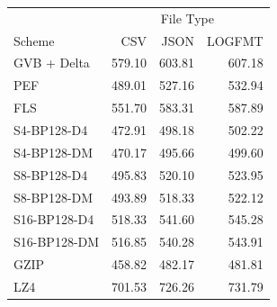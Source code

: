 \begin{tabular}{lrrr}
\toprule
 & \multicolumn{3}{c}{File Type} \\
Scheme & CSV & JSON & LOGFMT \\
\midrule
GVB + Delta & 579.10 & 603.81 & 607.18 \\
PEF & 489.01 & 527.16 & 532.94 \\
FLS & 551.70 & 583.31 & 587.89 \\
S4-BP128-D4 & 472.91 & 498.18 & 502.22 \\
S4-BP128-DM & 470.17 & 495.66 & 499.60 \\
S8-BP128-D4 & 495.83 & 520.10 & 523.95 \\
S8-BP128-DM & 493.89 & 518.33 & 522.12 \\
S16-BP128-D4 & 518.33 & 541.60 & 545.28 \\
S16-BP128-DM & 516.85 & 540.28 & 543.91 \\
GZIP & 458.82 & 482.17 & 481.81 \\
LZ4 & 701.53 & 726.26 & 731.79 \\
\bottomrule
\end{tabular}
